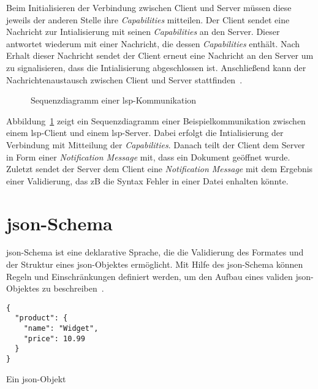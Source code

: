 Beim Initialisieren der Verbindung zwischen Client und Server müssen diese jeweils der anderen Stelle ihre \textit{Capabilities} mitteilen.
Der Client sendet eine Nachricht zur Intialisierung mit seinen \textit{Capabilities} an den Server.
Dieser antwortet wiederum mit einer Nachricht, die dessen \textit{Capabilities} enthält.
Nach Erhalt dieser Nachricht sendet der Client erneut eine Nachricht an den Server um zu signalisieren, dass die Intialisierung abgeschlossen ist.
Anschließend kann der Nachrichtenaustausch zwischen Client und Server stattfinden~\cite{lsp-microsoft,lsp-medium}.

\begin{figure}[htp] %
      \centering
      \caption{Sequenzdiagramm einer \acs{lsp}-Kommunikation}
      \label{fig:lsp-sequence-diagram}
\end{figure}

Abbildung~\ref{fig:lsp-sequence-diagram} zeigt ein Sequenzdiagramm einer Beispielkommunikation zwischen einem \ac{lsp}-Client und einem \ac{lsp}-Server.
Dabei erfolgt die Intialisierung der Verbindung mit Mitteilung der \textit{Capabilities}.
Danach teilt der Client dem Server in Form einer \textit{Notification Message} mit, dass ein Dokument geöffnet wurde.
Zuletzt sendet der Server dem Client eine \textit{Notification Message} mit dem Ergebnis einer Validierung, das \acs{zB} die Syntax Fehler in einer Datei enhalten könnte.

\section{\acs{json}-Schema}\label{sec:json-schema}

\acs{json}-Schema ist eine deklarative Sprache, die die Validierung des Formates und der Struktur eines \ac{json}-Objektes ermöglicht.
Mit Hilfe des \acs{json}-Schema können Regeln und Einschränkungen definiert werden, um den Aufbau eines validen \ac{json}-Objektes zu beschreiben~\cite{json-schema-description}.

\begin{listing}[htp]
      \begin{verbatim}
{
  "product": {
    "name": "Widget",
    "price": 10.99
  }
}
      \end{verbatim}
      \caption{Ein \acs{json}-Objekt}
      \label{lst:json-object}
\end{listing}

